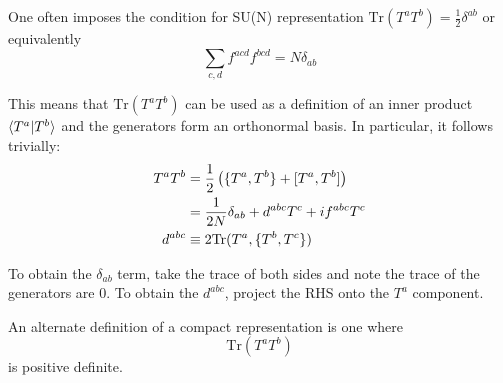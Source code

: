 \documentclass[11pt]{scrartcl}
\begin{document}
\begin{example}
	One often imposes the condition for SU(N) representation
	$\mathrm{Tr} (T^a T^b) = \frac12 \delta^{ab}$
	or equivalently
	\[ \sum_{c,d} f^{acd} f^{bcd} = N \delta_{ab} \]
	
	This means that $\mathrm{Tr} (T^a T^b)$ can be used as a definition of an inner product $\braket{T^a| T^b}$ and the generators form an orthonormal basis.
	In particular, it follows trivially:
	\begin{align}
	 T^a T^b &= \frac12 \left( \{ T^a, T^b\} + [T^a, T^b] \right) \\
	 &= {1 \over 2 N} \delta_{ab} + d^{abc} T^c + if^{abc} T^c  \\
	 d^{abc} &\equiv 2 \mathrm{Tr}(T^a, \{  T^b, T^c \})
	 \end{align}
 	
 	 To obtain the $\delta_{ab}$ term, take the trace of both sides and note the trace of the generators are 0.
 	 To obtain the $d^{abc}$, project the RHS onto the $T^a$ component.
\end{example}
\begin{example}
	An alternate definition of a compact representation is one where
	\[\mathrm{Tr} (T^a T^b) \]
	is positive definite.  
\end{example}
\end{document}
